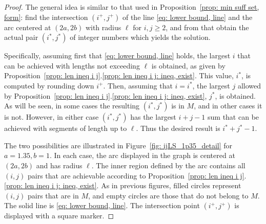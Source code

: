 \documentclass[12pt, a4paper]{article}
\newcommand{\len}{\ell} %
\newcommand{\isolr}{i^+}
\newcommand{\jsolr}{j^+}
\newcommand{\isoli}{i^\ast}
\newcommand{\jsoli}{j^\ast}
\newcommand{\mss}{M}
\begin{document}
\begin{proof}
The general idea is similar to that used in Proposition~\ref{prop: min suff set, form}: find the intersection $(\isolr, \jsolr)$ of the line \eqref{eq: lower bound, line} and the arc centered at $(2a,2b)$ with radius $\len$ for $i, j \geq 2$, and from that obtain the actual pair $(\isoli, \jsoli)$ of integer numbers which yields the solution.

Specifically, assuming first that \eqref{eq: lower bound, line} holds, the largest $i$ that can be achieved with lengths not exceeding $\len$ is obtained, as given by Proposition~\ref{prop: len ineq i j}.\ref{prop: len ineq i j: ineq, exist}. This value, $\isoli$, is computed by rounding down $\isolr$. Then, assuming that $i = \isoli$, the largest $j$ allowed by Proposition~\ref{prop: len ineq i j}.\ref{prop: len ineq i j: ineq, exist}, $\jsoli$, is obtained. As will be seen, in some cases the resulting $(\isoli,\jsoli)$ is in $\mss$, and in other cases it is not. However, in either case $(\isoli,\jsoli)$ has the largest $i+j-1$ sum that can be achieved with segments of length up to $\len$. Thus the desired result is $\isoli+\jsoli-1$.

The two possibilities are illustrated in Figure~\ref{fig: ijLS_1p35_detail} for $a=1.35, b=1$. In each case, the arc displayed in the graph is centered at $(2a,2b)$ and has radius $\len$. The inner region defined by the arc contains all $(i,j)$ pairs that are achievable according to Proposition~\ref{prop: len ineq i j}.\ref{prop: len ineq i j: ineq, exist}. As in previous figures, filled circles represent $(i,j)$ pairs that are in $\mss$, and empty circles are those that do not belong to $\mss$. The solid line is \eqref{eq: lower bound, line}. The intersection point $(\isolr, \jsolr)$ is displayed with a square marker.


\end{proof}
\end{document}
